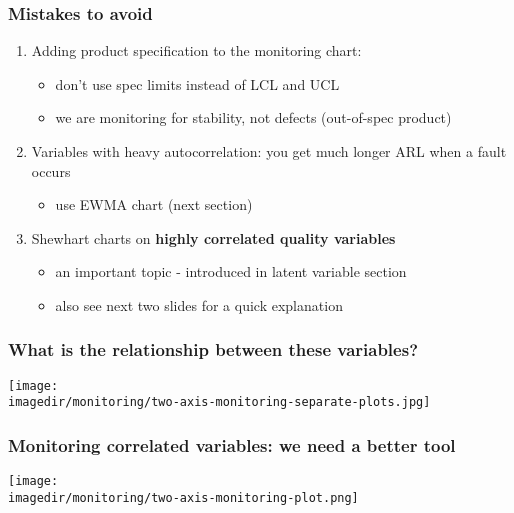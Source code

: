\begin{frame}\frametitle{Mistakes to avoid}
	\begin{enumerate}
		\item	Adding product specification to the monitoring chart:
		\begin{itemize}
			\item	don't use spec limits instead of LCL and UCL
			\item	we are monitoring for stability, not defects (out-of-spec product)
		\end{itemize}
		\item	Variables with heavy autocorrelation: you get much longer ARL when a fault occurs
		\begin{itemize}
			\item	use EWMA chart (next section)
		\end{itemize}
		\item	Shewhart charts on \textbf{highly correlated quality variables}
		\begin{itemize}
			\item	an important topic - introduced in latent variable section
			\item	also see next two slides for a quick explanation
		\end{itemize}
	\end{enumerate}
\end{frame}

\begin{frame}\frametitle{What is the relationship between these variables?}
	\begin{center}
		\texttt{[image: \\imagedir/monitoring/two-axis-monitoring-separate-plots.jpg]}
	\end{center}
\end{frame}

\begin{frame}\frametitle{Monitoring correlated variables: we need a better tool}
	\begin{center}
		\texttt{[image: \\imagedir/monitoring/two-axis-monitoring-plot.png]}
	\end{center}
\end{frame}

